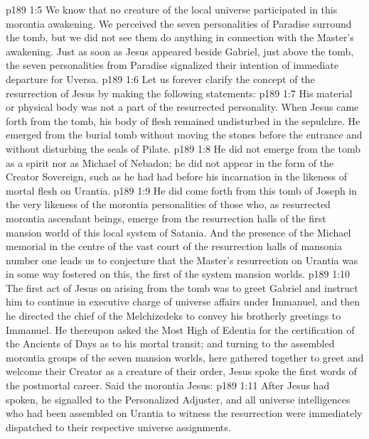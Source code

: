 \vs p189 1:5 We know that no creature of the local universe participated in this morontia awakening. We perceived the seven personalities of Paradise surround the tomb, but we did not see them do anything in connection with the Master’s awakening. Just as soon as Jesus appeared beside Gabriel, just above the tomb, the seven personalities from Paradise signalized their intention of immediate departure for Uversa.
\vs p189 1:6 Let us forever clarify the concept of the resurrection of Jesus by making the following statements:
\vs p189 1:7 \bibnobreakspace His material or physical body was not a part of the resurrected personality. When Jesus came forth from the tomb, his body of flesh remained undisturbed in the sepulchre. He emerged from the burial tomb without moving the stones before the entrance and without disturbing the seals of Pilate.
\vs p189 1:8 \bibnobreakspace He did not emerge from the tomb as a spirit nor as Michael of Nebadon; he did not appear in the form of the Creator Sovereign, such as he had had before his incarnation in the likeness of mortal flesh on Urantia.
\vs p189 1:9 \bibnobreakspace He did come forth from this tomb of Joseph in the very likeness of the morontia personalities of those who, as resurrected morontia ascendant beings, emerge from the resurrection halls of the first mansion world of this local system of Satania. And the presence of the Michael memorial in the centre of the vast court of the resurrection halls of mansonia number one leads us to conjecture that the Master’s resurrection on Urantia was in some way fostered on this, the first of the system mansion worlds.
\vs p189 1:10 \pc The first act of Jesus on arising from the tomb was to greet Gabriel and instruct him to continue in executive charge of universe affairs under Immanuel, and then he directed the chief of the Melchizedeks to convey his brotherly greetings to Immanuel. He thereupon asked the Most High of Edentia for the certification of the Ancients of Days as to his mortal transit; and turning to the assembled morontia groups of the seven mansion worlds, here gathered together to greet and welcome their Creator as a creature of their order, Jesus spoke the first words of the postmortal career. Said the morontia Jesus: 
\vs p189 1:11 After Jesus had spoken, he signalled to the Personalized Adjuster, and all universe intelligences who had been assembled on Urantia to witness the resurrection were immediately dispatched to their respective universe assignments.
